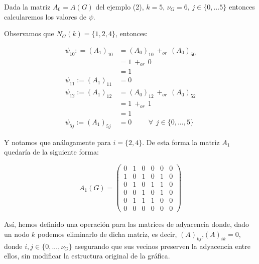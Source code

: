 \begin{example}
    Dada la matriz $A_0 = A(G)$ del ejemplo (2), $k = 5$, $\nu_G = 6$, $j \in \{0,...5\}$ entonces calcularemos los valores de $\psi$.

    Observamos que $N_G(k) = \{1,2,4\}$, entonces:

    \begin{align*}
    \psi_{10} : = (A_1)_{10 } &= (A_0)_{10} \hspace{5pt} +_{or} \hspace{5pt} (A_0)_{50} \\
     &= 1 \hspace{5pt} +_{or} \hspace{5pt} 0 \\
     &= 1\\
    \psi_{11} := (A_1)_{11} &= 0 \\
    \psi_{12} := (A_1)_{12} &= (A_0)_{12}  \hspace{5pt} +_{or} \hspace{5pt} (A_0)_{52}\\
        &= 1 \hspace{5pt} +_{or} \hspace{5pt} 1\\
        &= 1\\
        \psi_{5j} := (A_1)_{5j} &= 0 \hspace{1cm} \forall \hspace{5pt} j \in \{0,...,5\}
    \end{align*}
    
    
    

    Y notamos que análogamente para $i = \{2,4\}$.
    De esta forma la matriz $A_1$ quedaría de la siguiente forma:

    \begin{center}
\begin{equation}
A_1(G) =
\begin{pmatrix}
0 & 1 & 0 & 0 & 0 & 0\\
1 & 0 & 1 & 0 & 1 & 0\\
0 & 1 & 0 & 1 & 1 & 0\\
0 & 0 & 1 & 0 & 1 & 0\\
0 & 1 & 1 & 1 & 0 & 0\\
0 & 0 & 0 & 0 & 0 & 0
\end{pmatrix}
\end{equation}
\end{center}
\end{example}
Así, hemos definido una operación para las matrices de adyacencia donde, dado un nodo $k$ podemos eliminarlo de dicha matriz, es decir, $(A)_{kj}$,$(A)_{ik} = 0$, donde $i,j \in \{0,...,\nu_G \}$ asegurando que sus vecinos preserven la adyacencia entre ellos, sin modificar la estructura original de la gráfica.
